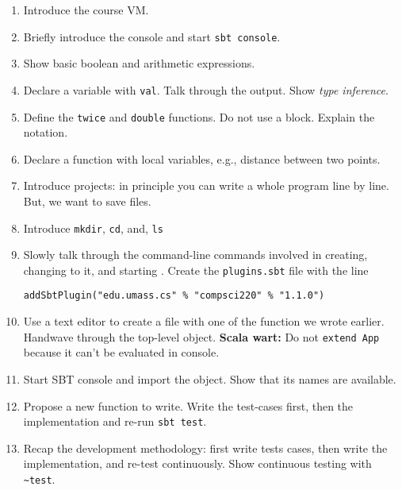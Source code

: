 \documentclass[9pt]{extbook}
\begin{document}
\begin{enumerate}

\item Introduce the course VM.


\item Briefly introduce the console and start \verb|sbt console|.

\item Show basic boolean and arithmetic expressions.

\item Declare a variable with \lstinline|val|. Talk through the output.
Show \emph{type inference}.

\item Define the \lstinline|twice| and \lstinline|double| functions.
Do not use a block. Explain the notation.

\item Declare a function with local variables, e.g., distance between
two points.

\item Introduce projects: in principle you can write a whole program
line by line. But, we want to save files.

\item  Introduce \verb|mkdir|, \verb|cd|, and, \verb|ls|

\item Slowly talk through the command-line commands involved in
creating, changing to it, and starting \sbt{}. Create
the \texttt{plugins.sbt} file with the line

\begin{lstlisting}
addSbtPlugin("edu.umass.cs" % "compsci220" % "1.1.0")
\end{lstlisting}

\item Use a text editor to create a file with one of the function
we wrote earlier. Handwave through the top-level object.
 \textbf{Scala wart:} Do not \verb|extend App| because it can't be evaluated in console.

\item Start SBT console and import the object. Show that its names
are available.

\item Propose a new function to write. Write the test-cases first, then
the implementation and re-run \verb|sbt test|.

\item Recap the development methodology: first write tests cases, then
write the implementation, and re-test continuously. Show continuous
testing with \verb|~test|.


\end{enumerate}
\end{document}
